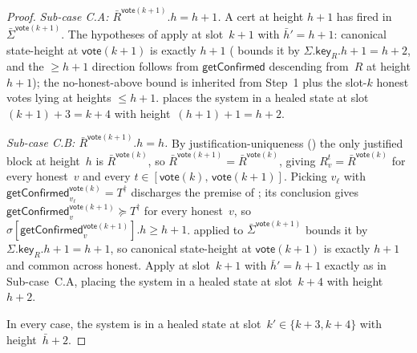\ifx\litemode\undefined\documentclass{article}\fi
\newcommand{\key}{\mathsf{key}}
\newcommand{\vote}{\mathsf{vote}}
\newcommand{\comm}[1]{\bar{#1}}
\newcommand{\getConfirmed}{\textsf{getConfirmed}\xspace}
\theoremstyle{plain}
\theoremstyle{definition}
\theoremstyle{remark}
\begin{document}
\begin{proof}
\emph{Sub-case C.A: $\comm{R}^{\vote(k+1)}.h = h+1$.}
A cert at height $h+1$ has fired in $\comm{\Sigma}^{\vote(k+1)}$. The hypotheses of  apply at slot~$k+1$ with $\comm{h}' = h+1$: canonical state-height at $\vote(k+1)$ is exactly $h+1$ ( bounds it by $\Sigma.\key_R.h + 1 = h+2$, and the $\geq h+1$ direction follows from $\getConfirmed$ descending from~$R$ at height $h+1$); the no-honest-above bound is inherited from Step~1 plus the slot-$k$ honest votes lying at heights $\leq h+1$.  places the system in a healed state at slot~$(k+1)+3 = k+4$ with height~$(h+1)+1 = h+2$.

\emph{Sub-case C.B: $\comm{R}^{\vote(k+1)}.h = h$.}
By justification-uniqueness () the only justified block at height~$h$ is $\comm{R}^{\vote(k)}$, so $\comm{R}^{\vote(k+1)} = \comm{R}^{\vote(k)}$, giving $R_v^t = \comm{R}^{\vote(k)}$ for every honest~$v$ and every $t \in [\vote(k),\, \vote(k+1)]$. Picking $v_\ell$ with $\getConfirmed_{v_\ell}^{\vote(k)} = T^\dagger$ discharges the premise of ; its conclusion gives $\getConfirmed_v^{\vote(k+1)} \succeq T^\dagger$ for every honest~$v$, so $\sigma[\getConfirmed_v^{\vote(k+1)}].h \geq h + 1$.  applied to $\comm{\Sigma}^{\vote(k+1)}$ bounds it by $\Sigma.\key_R.h + 1 = h + 1$, so canonical state-height at $\vote(k+1)$ is exactly $h+1$ and common across honest. Apply  at slot~$k+1$ with $\comm{h}' = h+1$ exactly as in Sub-case~C.A, placing the system in a healed state at slot~$k+4$ with height~$h+2$.

In every case, the system is in a healed state at slot~$k' \in \{k+3, k+4\}$ with height~$\comm{h}+2$.
\end{proof}
\end{document}
